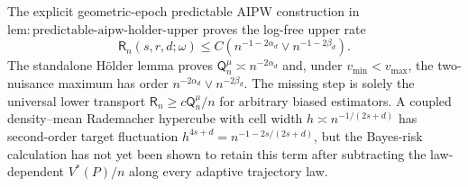 The explicit geometric-epoch predictable AIPW construction in \(\mathrm{lem{:}predictable\text{-}aipw\text{-}holder\text{-}upper}\) proves the log-free upper rate
\[
\mathsf R_n(s,r,d;\omega)
\leq C\left(n^{-1-2\alpha_d}\vee n^{-1-2\beta_d}\right).
\]
The standalone Hölder lemma proves \(\mathsf Q_n^{\mu}\asymp n^{-2\alpha_d}\) and, under \(v_{\min}<v_{\max}\), the two-nuisance maximum has order \(n^{-2\alpha_d}\vee n^{-2\beta_d}\).  The missing step is solely the universal lower transport
\(\mathsf R_n\geq c\mathsf Q_n^{\mu}/n\) for arbitrary biased estimators.  A coupled density--mean Rademacher hypercube with cell width \(h\asymp n^{-1/(2s+d)}\) has second-order target fluctuation \(h^{4s+d}=n^{-1-2s/(2s+d)}\), but the Bayes-risk calculation has not yet been shown to retain this term after subtracting the law-dependent \(V^*(P)/n\) along every adaptive trajectory law.